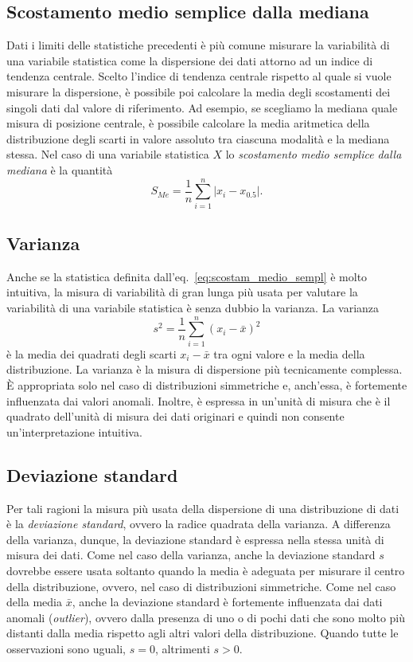 \subsection{Scostamento medio semplice dalla mediana}

Dati i limiti delle statistiche precedenti è più comune misurare la variabilità di una variabile statistica come la dispersione dei dati attorno ad un indice di tendenza centrale. 
Scelto l'indice di tendenza centrale rispetto al quale si vuole misurare la dispersione, è possibile poi calcolare la media degli scostamenti dei singoli dati dal valore di riferimento. 
Ad esempio, se scegliamo la mediana quale misura di posizione centrale, è possibile calcolare la media aritmetica della distribuzione degli scarti in valore assoluto tra ciascuna modalità e la mediana stessa.
Nel caso di una variabile statistica $X$ lo \emph{scostamento medio semplice dalla mediana} è la quantità 
\begin{equation}
S_{Me} = \frac{1}{n} \sum_{i=1}^n |x_i - x_{0.5}|.
\label{eq:scostam_medio_sempl}
\end{equation} 


\subsection{Varianza}

Anche se la statistica definita dall'eq.~\eqref{eq:scostam_medio_sempl} è molto intuitiva, la misura di variabilità di gran lunga più usata per valutare la variabilità di una variabile statistica è senza dubbio la varianza.
La varianza 
\begin{equation}
s^2 = \frac{1}{n} \sum_{i=1}^n (x_i - \bar{x})^2
\label{eq:var_descr}
\end{equation} 
è la media dei quadrati degli scarti $x_i - \bar{x}$ tra ogni valore e la media della distribuzione. 
La varianza è la misura di dispersione più tecnicamente complessa.
È appropriata solo nel caso di distribuzioni simmetriche e, anch'essa, è fortemente influenzata dai valori anomali.
Inoltre, è espressa in un'unità di misura che è il quadrato dell'unità di misura dei dati originari e quindi non consente un'interpretazione intuitiva.


\subsection{Deviazione standard}

Per tali ragioni la misura più usata della dispersione di una distribuzione di dati è la \emph{deviazione standard}, ovvero la radice quadrata della varianza.
A differenza della varianza, dunque, la deviazione standard è espressa nella stessa unità di misura dei dati.
Come nel caso della varianza, anche la deviazione standard $s$ dovrebbe essere usata soltanto quando la media è adeguata per misurare il centro della distribuzione, ovvero, nel caso di distribuzioni simmetriche. 
Come nel caso della media $\bar{x}$, anche la deviazione standard è fortemente influenzata dai dati anomali (\emph{outlier}), ovvero dalla presenza di uno o di pochi dati che sono molto più distanti dalla media rispetto agli altri valori della distribuzione.
Quando tutte le osservazioni sono uguali, $s=0$, altrimenti $s > 0$. 

